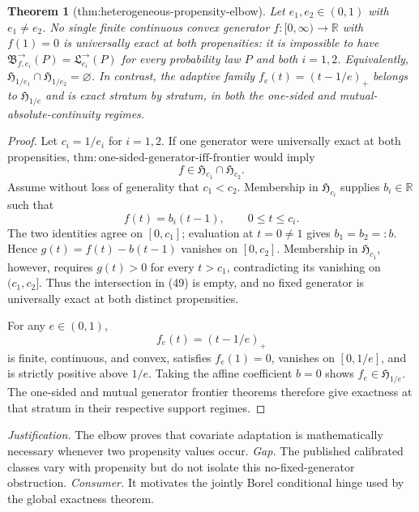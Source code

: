 \documentclass{article}
\newtheorem{theorem}{Theorem}
\begin{document}
\begin{theorem}[thm:heterogeneous-propensity-elbow]\label{thm:heterogeneous-propensity-elbow}
Let \(e_1,e_2\in(0,1)\) with \(e_1\ne e_2\). No single finite continuous convex generator \(f:[0,\infty)\to\mathbb R\) with \(f(1)=0\) is universally exact at both propensities: it is impossible to have \(\mathfrak B^{\to}_{f,e_i}(P)=\mathfrak L^{\to}_{e_i}(P)\) for every probability law \(P\) and both \(i=1,2\). Equivalently, \(\mathfrak H_{1/e_1}\cap\mathfrak H_{1/e_2}=\varnothing\). In contrast, the adaptive family \(f_e(t)=(t-1/e)_+\) belongs to \(\mathfrak H_{1/e}\) and is exact stratum by stratum, in both the one-sided and mutual-absolute-continuity regimes.
\end{theorem}
\begin{proof}
Let \(c_i=1/e_i\) for \(i=1,2\).  If one generator were universally exact at both propensities, \(\mathrm{thm:one\text{-}sided\text{-}generator\text{-}iff\text{-}frontier}\) would imply
\[
 f\in\mathfrak H_{c_1}\cap\mathfrak H_{c_2}. \tag{49}
\]
Assume without loss of generality that \(c_1<c_2\).  Membership in \(\mathfrak H_{c_i}\) supplies \(b_i\in\mathbb R\) such that
\[
 f(t)=b_i(t-1),\qquad 0\le t\le c_i.
\]
The two identities agree on \([0,c_1]\); evaluation at \(t=0\ne1\) gives \(b_1=b_2=:b\).  Hence \(g(t)=f(t)-b(t-1)\) vanishes on \([0,c_2]\).  Membership in \(\mathfrak H_{c_1}\), however, requires \(g(t)>0\) for every \(t>c_1\), contradicting its vanishing on \((c_1,c_2]\).  Thus the intersection in (49) is empty, and no fixed generator is universally exact at both distinct propensities.

For any \(e\in(0,1)\),
\[
 f_e(t)=(t-1/e)_+
\]
is finite, continuous, and convex, satisfies \(f_e(1)=0\), vanishes on \([0,1/e]\), and is strictly positive above \(1/e\).  Taking the affine coefficient \(b=0\) shows \(f_e\in\mathfrak H_{1/e}\).  The one-sided and mutual generator frontier theorems therefore give exactness at that stratum in their respective support regimes.
\end{proof}
\par\smallskip\noindent \textit{Justification.} The elbow proves that covariate adaptation is mathematically necessary whenever two propensity values occur. \textit{Gap.} The published calibrated classes vary with propensity but do not isolate this no-fixed-generator obstruction. \textit{Consumer.} It motivates the jointly Borel conditional hinge used by the global exactness theorem.
\end{document}
